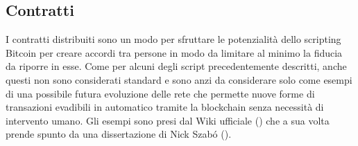 \subsection{Contratti}\label{contratti}

I contratti distribuiti sono un modo per sfruttare le potenzialità dello scripting Bitcoin per creare accordi tra persone in modo da limitare al minimo la fiducia da riporre in esse. Come per alcuni degli script precedentemente descritti, anche questi non sono considerati standard e sono anzi da considerare solo come esempi di una possibile futura evoluzione delle rete che permette nuove forme di transazioni evadibili in automatico tramite la blockchain senza necessità di intervento umano. Gli esempi sono presi dal Wiki ufficiale (\cite{bitcoin-contracts}) che a sua volta prende spunto da una dissertazione di Nick Szab\'{o} (\cite{nick-szabo}).\\

